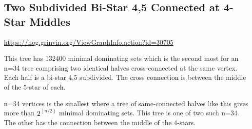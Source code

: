 \documentclass{article}
\begin{document}
\subsection{Two Subdivided Bi-Star 4,5 Connected at 4-Star Middles}

\url{https://hog.grinvin.org/ViewGraphInfo.action?id=30705}

\smallskip

This tree has 132400 minimal dominating sets which is the second most
for an n=34 tree comprising two identical halves cross-connected at
the same vertex.  Each half is a bi-star 4,5 subdivided.  The cross
connection is between the middle of the 5-star of each.

n=34 vertices is the smallest where a tree of same-connected halves
like this gives more than $2^(n/2)$ minimal dominating sets.  This
tree is one of two such n=34.  The other has the connection between
the middle of the 4-stars.
\end{document}
